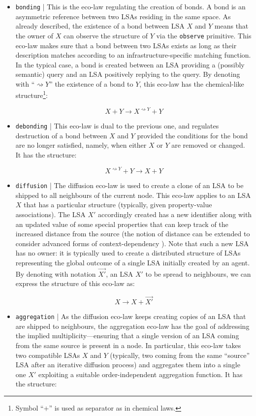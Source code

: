 \documentclass[12pt,a4paper,twoside,openright]{book}
\begin{document}
\begin{itemize}

 \item \texttt{bonding}  | This is the eco-law regulating the creation of bonds. A bond is an asymmetric reference between two LSAs residing in the same space. As already described, the existence of a bond between LSA $X$ and $Y$ means that the owner of $X$ can observe the structure of $Y$ via the \texttt{observe} primitive. This eco-law makes sure that a bond between two LSAs exists as long as their description matches according to an infrastructure-specific matching function. In the typical case, a bond is created between an LSA providing a (possibly semantic) query and an LSA positively replying to the query. By denoting with ``$\rightsquigarrow Y$'' the existence of a bond to $Y$, this eco-law has the chemical-like structure\footnote{Symbol ``$+$'' is used as separator as in chemical laws.}:
 
 \[X + Y \rightarrow X^{\rightsquigarrow Y} + Y\]
 
 \item \texttt{debonding}  | This eco-law is dual to the previous one, and regulates destruction of a bond between $X$ and $Y$ provided the conditions for the bond are no longer satisfied, namely, when either $X$ or $Y$ are removed or changed. It has the structure:
 
 \[X^{\rightsquigarrow Y} + Y \rightarrow X + Y\]
 
 \item \texttt{diffusion} | The diffusion eco-law is used to create a clone of an LSA to be shipped to all neighbours of the current node. This eco-law applies to an LSA $X$ that has a particular structure (typically, given property-value associations). The LSA $X'$ accordingly created has a new identifier along with an updated value of some special properties that can keep track of the increased distance from the source (the notion of distance can be extended to consider advanced forms of context-dependency \cite{SemMatchingSAC2013}). Note that such a new LSA has no owner: it is typically used to create a distributed structure of LSAs representing the global outcome of a single LSA initially created by an agent. By denoting with notation $\overrightarrow{X'}$, an LSA $X'$ to be spread to neighbours, we can express the structure of this eco-law as:
 
 \[X \rightarrow X + \overrightarrow{X'}\]
 
 \item \texttt{aggregation} | As the diffusion eco-law keeps creating copies of an LSA that are shipped to neighbours, the aggregation eco-law has the goal of addressing the implied multiplicity---ensuring that a single version of an LSA coming from the same source is present in a node. In particular, this eco-law takes two compatible LSAs $X$ and $Y$ (typically, two coming from the same ``source'' LSA after an iterative diffusion process) and aggregates them into a single one $X'$ exploiting a suitable order-independent aggregation function. It has the structure:
 

\end{itemize}
\end{document}
